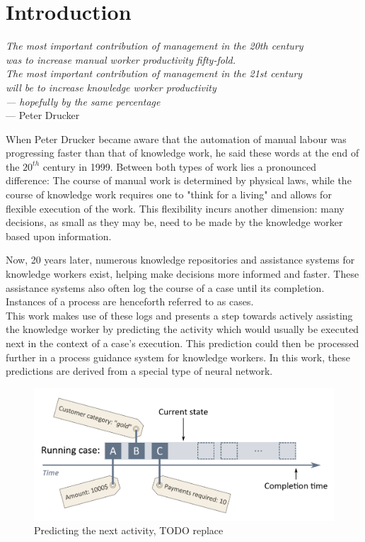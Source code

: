 \chapter{Introduction}\label{sec:intro}
\begin{flushright}{\slshape    
The most important contribution of management in the 20th century\\
was to increase manual worker productivity fifty-fold.\\
The most important contribution of management in the 21st century\\
will be to increase knowledge worker productivity\\
— hopefully by the same percentage} \\ \medskip
--- Peter Drucker~\cite{drucker1999}
\end{flushright}

When Peter Drucker became aware that the automation of manual labour was progressing faster than that of knowledge work, he said these words at the end of the $20^{th}$ century in 1999. Between both types of work lies a pronounced difference: The course of manual work is determined by physical laws, while the course of knowledge work requires one to "think for a living" and allows for flexible execution of the work. This flexibility incurs another dimension: many decisions, as small as they may be, need to be made by the knowledge worker based upon information.

Now, 20 years later, numerous knowledge repositories and assistance systems for knowledge workers exist, helping make decisions more informed and faster. These assistance systems also often log the course of a case until its completion. Instances of a process are henceforth referred to as cases.\\

This work makes use of these logs and presents a step towards actively assisting the knowledge worker by predicting the activity which would usually be executed next in the context of a case's execution. This prediction could then be processed further in a process guidance system for knowledge workers. In this work, these predictions are derived from a special type of neural network.\\

\begin{figure}
    \centering
    \includegraphics[width=\textwidth]{gfx/next-activity.png}
    \caption{Predicting the next activity, TODO replace}
    \label{fig:next-activity-prediction}
\end{figure}

